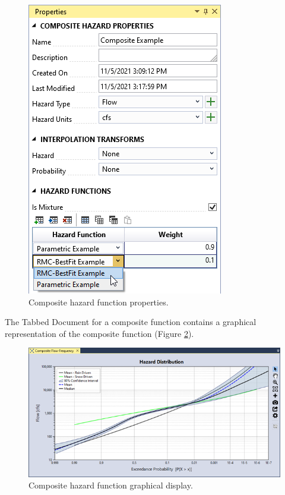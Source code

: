 \documentclass[
]{book}
\begin{document}
\begin{figure}

{\centering \includegraphics{images/figure72} 

}

\caption{Composite hazard function properties.}\label{fig:figure-72}
\end{figure}

The Tabbed Document for a composite function contains a graphical representation of the composite function (Figure \ref{fig:figure-73}).

\begin{figure}

{\centering \includegraphics{images/figure73} 

}

\caption{Composite hazard function graphical display.}\label{fig:figure-73}
\end{figure}
\end{document}
